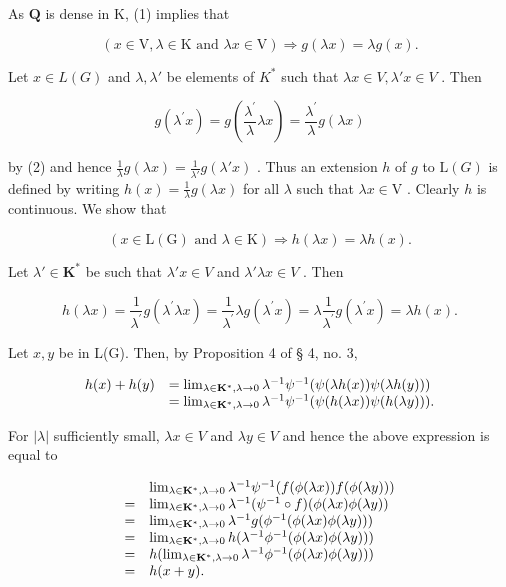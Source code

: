 As \(\mathbf{Q}\) is dense in K, (1) implies that

\[
(x \in \mathrm{V}, \lambda \in \mathrm{K} \text {   and   } \lambda x \in \mathrm{V}) \Rightarrow g (\lambda x) = \lambda g (x).\tag{2}
\]

Let \(x \in L(G)\) and \(\lambda, \lambda'\) be elements of \(K^*\) such that \(\lambda x \in V, \lambda' x \in V\) . Then

\[
g (\lambda^ {\prime} x) = g \left(\frac {\lambda^ {\prime}}{\lambda} \lambda x\right) = \frac {\lambda^ {\prime}}{\lambda} g (\lambda x)
\]

by (2) and hence \(\frac{1}{\lambda} g(\lambda x) = \frac{1}{\lambda'} g(\lambda' x)\) . Thus an extension \(h\) of \(g\) to \(\mathrm{L}(G)\) is defined by writing \(h(x) = \frac{1}{\lambda} g(\lambda x)\) for all \(\lambda\) such that \(\lambda x \in \mathrm{V}\) . Clearly \(h\) is continuous. We show that

\[
(x \in \mathrm{L} (\mathrm{G}) \text {   and   } \lambda \in \mathrm{K}) \Rightarrow h (\lambda x) = \lambda h (x).\tag{3}
\]

Let \(\lambda' \in \mathbf{K}^*\) be such that \(\lambda' x \in V\) and \(\lambda' \lambda x \in V\) . Then

\[
h (\lambda x) = \frac {1}{\lambda^ {\prime}} g \left(\lambda^ {\prime} \lambda x\right) = \frac {1}{\lambda^ {\prime}} \lambda g \left(\lambda^ {\prime} x\right) = \lambda \frac {1}{\lambda^ {\prime}} g \left(\lambda^ {\prime} x\right) = \lambda h (x).
\]

Let \(x, y\) be in L(G). Then, by Proposition 4 of § 4, no. 3,

\[
\begin{array}{r l} h (x) + h (y) & = \lim _ {\lambda \in \mathbf {K} ^ {*},   \lambda \to 0} \lambda^ {- 1} \psi^ {- 1} (\psi (\lambda h (x)) \psi (\lambda h (y))) \\ & = \lim _ {\lambda \in \mathbf {K} ^ {*},   \lambda \to 0} \lambda^ {- 1} \psi^ {- 1} (\psi (h (\lambda x)) \psi (h (\lambda y))). \end{array}
\]

For \(|\lambda|\) sufficiently small, \(\lambda x \in V\) and \(\lambda y \in V\) and hence the above expression is equal to

\[
\begin{array}{r l} & \lim _ {\lambda \in \mathbf {K} ^ {*}, \lambda \to 0} \lambda^ {- 1} \psi^ {- 1} (f (\phi (\lambda x)) f (\phi (\lambda y))) \\ = & \lim _ {\lambda \in \mathbf {K} ^ {*}, \lambda \to 0} \lambda^ {- 1} (\psi^ {- 1} \circ f) (\phi (\lambda x) \phi (\lambda y)) \\ = & \lim _ {\lambda \in \mathbf {K} ^ {*}, \lambda \to 0} \lambda^ {- 1} g (\phi^ {- 1} (\phi (\lambda x) \phi (\lambda y))) \\ = & \lim _ {\lambda \in \mathbf {K} ^ {*}, \lambda \to 0} h (\lambda^ {- 1} \phi^ {- 1} (\phi (\lambda x) \phi (\lambda y))) \\ = & h (\lim _ {\lambda \in \mathbf {K} ^ {*}, \lambda \to 0} \lambda^ {- 1} \phi^ {- 1} (\phi (\lambda x) \phi (\lambda y))) \\ = & h (x + y). \end{array}
\]

